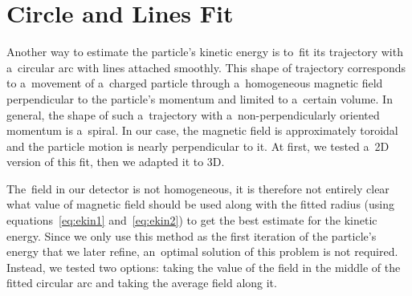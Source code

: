 	\section{Circle and Lines Fit}
	\label{sec:clines}
		Another way to estimate the particle's kinetic energy is to~fit its trajectory with a~circular arc with lines attached smoothly. This shape of trajectory corresponds to a~movement of a~charged particle through a~homogeneous magnetic field perpendicular to the particle's momentum and limited to a~certain volume. In general, the shape of such a~trajectory with a~non-perpendicularly oriented momentum is a~spiral. In our case, the magnetic field is approximately toroidal and the particle motion is nearly perpendicular to it. At first, we tested a~2D version of this fit, then we adapted it to 3D.
		
		The~field in our detector is not homogeneous, it is therefore not entirely clear what value of magnetic field should be used along with the fitted radius (using equations~\ref{eq:ekin1} and~\ref{eq:ekin2}) to get the best estimate for the kinetic energy. Since we only use this method as the first iteration of the particle's energy that we later refine, an~optimal solution of this problem is not required. Instead, we tested two options: taking the value of the field in the middle of the fitted circular arc and taking the average field along it.
		
